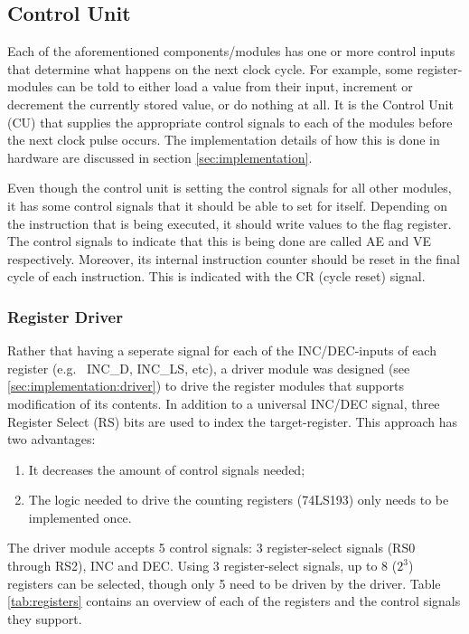 \subsection{Control Unit} \label{sec:architecture:cu}
Each of the aforementioned components/modules has one or more control inputs that determine what happens on the next clock cycle. For example, some register-modules can be told to either load a value from their input, increment or decrement the currently stored value, or do nothing at all. It is the Control Unit (CU) that supplies the appropriate control signals to each of the modules before the next clock pulse occurs. The implementation details of how this is done in hardware are discussed in section \ref{sec:implementation}.

Even though the control unit is setting the control signals for all other modules, it has some control signals that it should be able to set for itself. Depending on the instruction that is being executed, it should write values to the flag register. The control signals to indicate that this is being done are called AE and VE respectively. Moreover, its internal instruction counter should be reset in the final cycle of each instruction. This is indicated with the CR (cycle reset) signal.

\subsubsection*{Register Driver} \label{sec:architecture:cu:driver}
Rather that having a seperate signal for each of the INC/DEC-inputs of each register (e.g.~ INC\_D, INC\_LS, etc), a driver module was designed (see \ref{sec:implementation:driver}) to drive the register modules that supports modification of its contents. In addition to a universal INC/DEC signal, three Register Select (RS) bits are used to index the target-register. This approach has two advantages:
\begin{enumerate}
\item It decreases the amount of control signals needed;
\item The logic needed to drive the counting registers (74LS193) only needs to be implemented once.
\end{enumerate}

The driver module accepts 5 control signals: 3 register-select signals (RS0 through RS2), INC and DEC. Using 3 register-select signals, up to 8 ($2^3$) registers can be selected, though only 5 need to be driven by the driver. Table \ref{tab:registers} contains an overview of each of the registers and the control signals they support.

